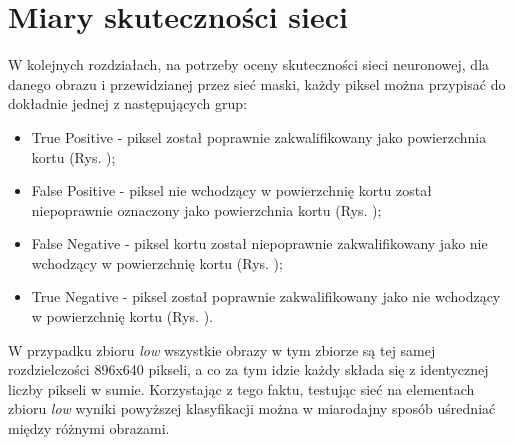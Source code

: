 \section{Miary skuteczności sieci}

W kolejnych rozdziałach, na potrzeby oceny skuteczności sieci neuronowej, dla danego obrazu i przewidzianej przez sieć maski, każdy piksel można przypisać do dokładnie jednej z następujących grup:

\begin{itemize}
  \item True Positive - piksel został poprawnie zakwalifikowany jako powierzchnia kortu (Rys. );
  \item False Positive - piksel nie wchodzący w powierzchnię kortu został niepoprawnie oznaczony jako powierzchnia kortu (Rys. );
  \item False Negative - piksel kortu został niepoprawnie zakwalifikowany jako nie wchodzący w powierzchnię kortu (Rys. );
  \item True Negative - piksel został poprawnie zakwalifikowany jako nie wchodzący w powierzchnię kortu (Rys. ).
\end{itemize}

W przypadku zbioru \textit{low} wszystkie obrazy w tym zbiorze są tej samej rozdzielczości 896x640 pikseli, a co za tym idzie każdy składa się z identycznej liczby pikseli w sumie.
Korzystając z tego faktu, testując sieć na elementach zbioru \textit{low} wyniki powyższej klasyfikacji można w miarodajny sposób uśredniać między różnymi obrazami.

